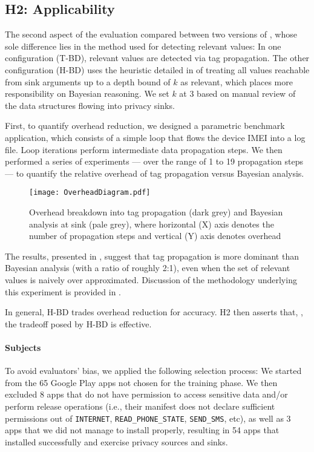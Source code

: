 \subsection{H2: Applicability}\label{Se:practical}
The second aspect of the evaluation compared between two versions of \Tool, whose sole difference lies in the method used for detecting relevant values: In one configuration (T-BD), relevant values are detected via tag propagation. The other configuration (H-BD) uses the heuristic detailed in  of treating all values reachable from sink arguments  up to a depth bound of $k$ as relevant, which places more responsibility on Bayesian reasoning. We set $k$ at 3 based on manual review of the data structures flowing into privacy sinks. 

 {First, to quantify overhead reduction, we designed a parametric benchmark application, which }
consists of a simple loop that flows the device IMEI into a log file.
Loop iterations perform intermediate data propagation steps. We then performed a series of experiments --- over the range of 1 to 19 propagation steps --- to quantify the relative overhead of tag propagation versus Bayesian analysis.

\begin{figure}
\texttt{[image: OverheadDiagram.pdf]}
\caption{\label{Fi:overhead}Overhead breakdown into tag propagation (dark grey) and Bayesian analysis at sink (pale grey), where horizontal (X) axis denotes the number of propagation steps and vertical (Y) axis denotes overhead}
\end{figure}

The results, presented in , suggest that  tag propagation is more dominant than  Bayesian analysis (with a ratio of roughly 2:1), even when the set of relevant values is naively over approximated. Discussion of the methodology underlying this experiment is provided in .

In general, H-BD trades overhead reduction for accuracy. 
H2 then asserts that, , the tradeoff posed by H-BD is effective. 

\paragraph{Subjects} To avoid evaluators' bias, we applied the following selection process: We started from the 65 Google Play apps not chosen for the training phase. We then excluded 8 apps that do not have permission to access sensitive data and/or perform release operations (i.e., their manifest does not declare sufficient permissions out of {\tt INTERNET}, {\tt READ\_PHONE\_STATE}, {\tt SEND\_SMS}, etc), as well as 3 apps that we did not manage to install properly, resulting in 54 apps that installed successfully and exercise privacy sources and sinks.

